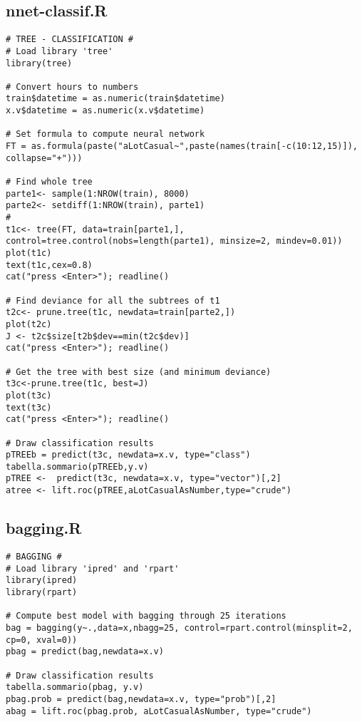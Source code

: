 \subsection{nnet-classif.R}\label{sec:script-nnet-classif}
\begin{verbatim}
# TREE - CLASSIFICATION #
# Load library 'tree'
library(tree)

# Convert hours to numbers
train$datetime = as.numeric(train$datetime)
x.v$datetime = as.numeric(x.v$datetime)

# Set formula to compute neural network
FT = as.formula(paste("aLotCasual~",paste(names(train[-c(10:12,15)]), collapse="+")))

# Find whole tree
parte1<- sample(1:NROW(train), 8000) 
parte2<- setdiff(1:NROW(train), parte1)
#
t1c<- tree(FT, data=train[parte1,], control=tree.control(nobs=length(parte1), minsize=2, mindev=0.01))
plot(t1c)
text(t1c,cex=0.8)
cat("press <Enter>"); readline()

# Find deviance for all the subtrees of t1
t2c<- prune.tree(t1c, newdata=train[parte2,])
plot(t2c)
J <- t2c$size[t2b$dev==min(t2c$dev)]
cat("press <Enter>"); readline()

# Get the tree with best size (and minimum deviance)
t3c<-prune.tree(t1c, best=J)
plot(t3c)
text(t3c)
cat("press <Enter>"); readline()

# Draw classification results
pTREEb = predict(t3c, newdata=x.v, type="class")
tabella.sommario(pTREEb,y.v)
pTREE <-  predict(t3c, newdata=x.v, type="vector")[,2]
atree <- lift.roc(pTREE,aLotCasualAsNumber,type="crude")
\end{verbatim}

\subsection{bagging.R}\label{sec:script-bagging}
\begin{verbatim}
# BAGGING #
# Load library 'ipred' and 'rpart'
library(ipred)
library(rpart)

# Compute best model with bagging through 25 iterations
bag = bagging(y~.,data=x,nbagg=25, control=rpart.control(minsplit=2, cp=0, xval=0))
pbag = predict(bag,newdata=x.v)

# Draw classification results
tabella.sommario(pbag, y.v)
pbag.prob = predict(bag,newdata=x.v, type="prob")[,2]
abag = lift.roc(pbag.prob, aLotCasualAsNumber, type="crude")
\end{verbatim}
